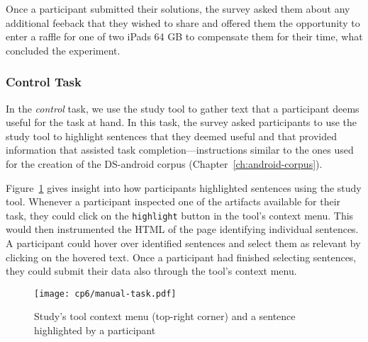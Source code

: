 Once a participant submitted their solutions, the survey
asked them about any additional feeback that they wished to share and 
offered them the opportunity to enter a raffle for one of two iPads 64 GB 
to compensate them for their time, what concluded the experiment.



\subsubsection{Control Task}
\label{cp6:procedures-manual}


In the \textit{control} task, we use the study tool to gather text that a participant deems useful for the task at hand. In this task, 
the survey asked participants to use the study tool to highlight sentences that they deemed useful and that provided information that assisted task completion---instructions similar to the ones used for the creation of the \acs{DS-android} corpus (Chapter~\ref{ch:android-corpus}).



Figure~\ref{fig:artifact-pre-highlight}
gives insight into how participants highlighted sentences using the study tool. 
Whenever a participant inspected one of the artifacts available for their task, 
they could click on the \texttt{highlight} button in the tool's context menu.  
This would then instrumented the HTML of the page identifying individual sentences. 
A participant could hover over identified sentences and select them as relevant by clicking on the hovered text.
Once a participant had finished selecting sentences, they could submit 
their data also through the tool's context menu.





\begin{figure}
    \centering
    \texttt{[image: cp6/manual-task.pdf]}
    \caption{Study's tool context menu (top-right corner) and a sentence highlighted by a participant}
    \label{fig:artifact-pre-highlight}
\end{figure}




